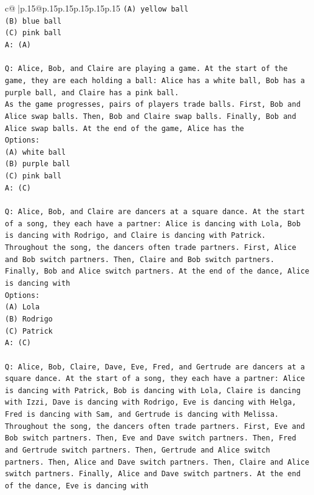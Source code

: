 \documentclass{article}
\begin{document}
{\begin{supertabular}{c@{$\;$}|p{.15\linewidth}@{}p{.15\linewidth}p{.15\linewidth}p{.15\linewidth}p{.15\linewidth}p{.15\linewidth}}
{{{\texttt{(A) yellow ball} \\
\texttt{(B) blue ball} \\
\texttt{(C) pink ball} \\
\texttt{A: (A)} \\
\\ 
\texttt{Q: Alice, Bob, and Claire are playing a game. At the start of the game, they are each holding a ball: Alice has a white ball, Bob has a purple ball, and Claire has a pink ball.} \\
\texttt{As the game progresses, pairs of players trade balls. First, Bob and Alice swap balls. Then, Bob and Claire swap balls. Finally, Bob and Alice swap balls. At the end of the game, Alice has the} \\
\texttt{Options:} \\
\texttt{(A) white ball} \\
\texttt{(B) purple ball} \\
\texttt{(C) pink ball} \\
\texttt{A: (C)} \\
\\ 
\texttt{Q: Alice, Bob, and Claire are dancers at a square dance. At the start of a song, they each have a partner: Alice is dancing with Lola, Bob is dancing with Rodrigo, and Claire is dancing with Patrick.} \\
\texttt{Throughout the song, the dancers often trade partners. First, Alice and Bob switch partners. Then, Claire and Bob switch partners. Finally, Bob and Alice switch partners. At the end of the dance, Alice is dancing with} \\
\texttt{Options:} \\
\texttt{(A) Lola} \\
\texttt{(B) Rodrigo} \\
\texttt{(C) Patrick} \\
\texttt{A: (C)} \\
\\ 
\texttt{Q: Alice, Bob, Claire, Dave, Eve, Fred, and Gertrude are dancers at a square dance. At the start of a song, they each have a partner: Alice is dancing with Patrick, Bob is dancing with Lola, Claire is dancing with Izzi, Dave is dancing with Rodrigo, Eve is dancing with Helga, Fred is dancing with Sam, and Gertrude is dancing with Melissa.} \\
\texttt{Throughout the song, the dancers often trade partners. First, Eve and Bob switch partners. Then, Eve and Dave switch partners. Then, Fred and Gertrude switch partners. Then, Gertrude and Alice switch partners. Then, Alice and Dave switch partners. Then, Claire and Alice switch partners. Finally, Alice and Dave switch partners. At the end of the dance, Eve is dancing with} \\
}}}
\end{supertabular}}
\end{document}
